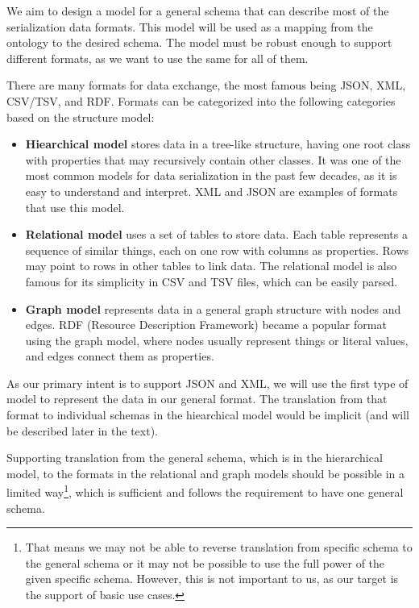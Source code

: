 \smallskip

We aim to design a model for a general schema that can describe most of the serialization data formats. This model will be used as a mapping from the ontology to the desired schema. The model must be robust enough to support different formats, as we want to use the same for all of them.

\medskip

There are many formats for data exchange, the most famous being JSON, XML, CSV/TSV, and RDF. Formats can be categorized into the following categories based on the structure model:
\begin{itemize}
    \item \textbf{Hiearchical model} stores data in a tree-like structure, having one root class with properties that may recursively contain other classes. It was one of the most common models for data serialization in the past few decades, as it is easy to understand and interpret. XML and JSON are examples of formats that use this model.
    \item \textbf{Relational model} uses a set of tables to store data. Each table represents a sequence of similar things, each on one row with columns as properties. Rows may point to rows in other tables to link data. The relational model is also famous for its simplicity in CSV and TSV files, which can be easily parsed.
    \item \textbf{Graph model} represents data in a general graph structure with nodes and edges. RDF (Resource Description Framework) became a popular format using the graph model, where nodes usually represent things or literal values, and edges connect them as properties.
\end{itemize}

As our primary intent is to support JSON and XML, we will use the first type of model to represent the data in our general format. The translation from that format to individual schemas in the hiearchical model would be implicit (and will be described later in the text).

Supporting translation from the general schema, which is in the hierarchical model, to the formats in the relational and graph models should be possible in a limited way\footnote{That means we may not be able to reverse translation from specific schema to the general schema or it may not be possible to use the full power of the given specific schema. However, this is not important to us, as our target is the support of basic use cases.}, which is sufficient and follows the requirement to have one general schema.

